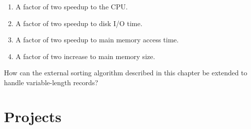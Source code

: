 \begin{exercises}
\begin{enumerate}
\item
A factor of two speedup to the CPU.

\item
A factor of two speedup to disk I/O time.

\item
A factor of two speedup to main memory access time.

\item
A factor of two increase to main memory size.
\end{enumerate}

\item
How can the external sorting
algorithm described in this chapter be extended to handle
variable-length records?

\end{exercises}

\section{Projects}

